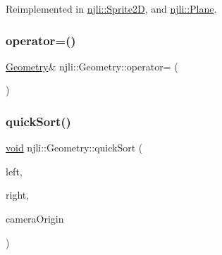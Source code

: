 Reimplemented in \mbox{\hyperlink{classnjli_1_1_sprite2_d_a565b51d4b11b9d35f6ca7e54fbf7fb8e}{njli\+::\+Sprite2D}}, and \mbox{\hyperlink{classnjli_1_1_plane_a0530fd624d0fbb1b2629f74e81a8b0fa}{njli\+::\+Plane}}.

\mbox{\label{classnjli_1_1_geometry_a191cc8461636a801bce0f2bf8f1992f6}} 
\subsubsection{\texorpdfstring{operator=()}{operator=()}}
{\footnotesize\ttfamily \mbox{\hyperlink{classnjli_1_1_geometry}{Geometry}}\& njli\+::\+Geometry\+::operator= (\begin{DoxyParamCaption}\item[{const \mbox{\hyperlink{classnjli_1_1_geometry}{Geometry}} \&}]{ }\end{DoxyParamCaption})\hspace{0.3cm}{\ttfamily [protected]}}

\mbox{\label{classnjli_1_1_geometry_af92dc57bfd9c3457085d2fdc4102cb22}} 
\subsubsection{\texorpdfstring{quick\+Sort()}{quickSort()}}
{\footnotesize\ttfamily \mbox{\hyperlink{_thread_8h_af1e856da2e658414cb2456cb6f7ebc66}{void}} njli\+::\+Geometry\+::quick\+Sort (\begin{DoxyParamCaption}\item[{signed long}]{left,  }\item[{signed long}]{right,  }\item[{const bt\+Vector3 \&}]{camera\+Origin }\end{DoxyParamCaption})\hspace{0.3cm}{\ttfamily [private]}}

\mbox{\label{classnjli_1_1_geometry_a95e2234f03e5a4fae599689e1545f323}} 
